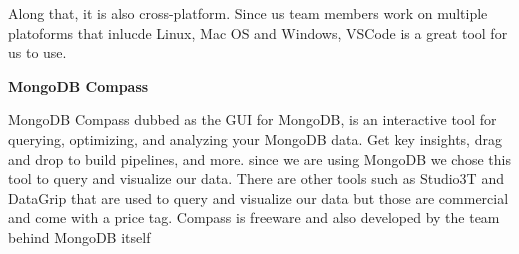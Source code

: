 Along that, it is also cross-platform. Since us team members work on multiple platoforms that inlucde Linux, Mac OS and Windows, VSCode is a great tool for us to use.

\hspace{5mm}


\textbf{MongoDB Compass}


MongoDB Compass dubbed as the GUI for MongoDB, is an interactive tool for querying, optimizing, and analyzing your MongoDB data. Get key insights, drag and drop to build pipelines, and more. since we are using MongoDB we chose this tool to query and visualize our data. There are other tools such as Studio3T and DataGrip that are used to query and visualize our data but those are commercial and come with a price tag. Compass is freeware and also developed by the team behind MongoDB itself



\newpage